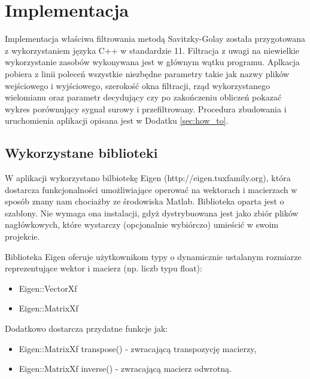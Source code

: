 \section{Implementacja}

Implementacja właściwa filtrowania metodą Savitzky-Golay została przygotowana z wykorzystaniem języka C++ w standardzie 11. Filtracja z uwagi na niewielkie wykorzystanie zasobów wykonywana jest w głównym wątku programu. 
Aplkacja pobiera z linii poleceń wszystkie niezbędne parametry takie jak nazwy plików wejściowego i wyjściowego, szerokość okna filtracji, rząd wykorzystanego wielomianu oraz parametr decydujący czy po zakończeniu obliczeń pokazać wykres porównujący sygnał surowy i przefiltrowany. Procedura zbudowania i uruchomienia aplikacji opisana jest w Dodatku \ref{sec:how_to}.



\subsection{Wykorzystane biblioteki}
W aplikacji wykorzystano bilbiotekę Eigen (http://eigen.tuxfamily.org), która dostarcza funkcjonalności umożliwiające operować na wektorach i macierzach w sposób znany nam chociażby ze środowiska Matlab. Biblioteka oparta jest o szablony. Nie wymaga ona instalacji, gdyż dystrybuowana jest jako zbiór plików nagłówkowych, które wystarczy (opcjonalnie wybiórczo) umieścić w swoim projekcie.

Biblioteka Eigen oferuje użytkownikom typy o dynamicznie ustalanym rozmiarze reprezentujące wektor i macierz (np. liczb typu float):
\begin{itemize}
  \item Eigen::VectorXf
  \item Eigen::MatrixXf
\end{itemize}

Dodatkowo dostarcza przydatne funkcje jak:
\begin{itemize}
  \item Eigen::MatrixXf transpose() - zwracającą transpozycję macierzy,
  \item Eigen::MatrixXf inverse() - zwracającą macierz odwrotną.
\end{itemize}


